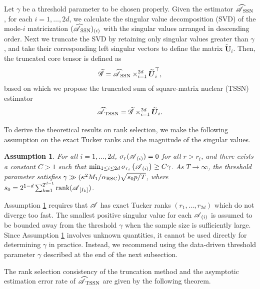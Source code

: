 \documentclass[12pt]{article}
\newtheorem{assumption}{Assumption}
\newcommand{\bm}{\boldsymbol}
\newcommand{\cm}[1]{\mbox{\boldmath$\mathscr{#1}$}}
\begin{document}

Let $\gamma$ be a threshold parameter to be chosen properly. Given the estimator  $\cm{\widehat{A}}_{\text{SSN}}$, for each $i=1, \dots, 2d$, we calculate the singular value decomposition (SVD) of the mode-$i$ matricization $(\cm{\widehat{A}}_{\text{SSN}})_{(i)}$ with the singular values arranged in descending order. Next we truncate the SVD by retaining only singular values greater than $\gamma$, and  take their corresponding left singular vectors to define the matrix $\bm{\widetilde{U}}_i$. Then, the truncated core tensor is defined as \[\cm{\widetilde{G}}=\cm{\widehat{A}}_{\text{SSN}}\times_{i=1}^{2d}\bm{\widetilde{U}}_i^\top,\]
based on which we propose the truncated sum of square-matrix nuclear (TSSN) estimator
\[
\cm{\widehat{A}}_{\text{TSSN}}=\cm{\widetilde{G}}\times_{i=1}^{2d}\bm{\widetilde{U}}_i.
\]

To derive the theoretical results on rank selection, we make the following assumption on the exact Tucker ranks and the magnitude of the singular values.

\begin{assumption}\label{asmp:truncate}
For all $i=1,\dots,2d$, $\sigma_r(\cm{A}_{(i)})=0$ for all $r>r_i$, and there exists a constant $C>1$ such that $\min_{1\leq i\leq 2d}\sigma_{r_i}\left(\cm{A}_{(i)}\right)\geq C\gamma$. As $T\rightarrow\infty$, the threshold parameter satisfies $\gamma \gg (\kappa^2M_1/\alpha_{\textup{RSC}}) \sqrt{s_0p/T}$, where $s_0=2^{1-d}\sum_{k=1}^{2^{d-1}}\textup{rank}(\cm{A}_{[I_k]})$.
\end{assumption}


Assumption \ref{asmp:truncate} requires that $\cm{A}$ has exact Tucker ranks $(r_1,\dots,r_{2d})$ which do not diverge too fast. The smallest positive singular value for each $\cm{A}_{(i)}$ is assumed to be bounded away from the threshold $\gamma$ when the sample size is sufficiently large. Since Assumption  \ref{asmp:truncate} involves unknown quantities, it cannot be used directly for determining $\gamma$ in practice.  Instead, we recommend using the data-driven threshold parameter $\gamma$ described at the end of the next subsection.

The rank selection consistency of the truncation method and the asymptotic estimation error rate of $\cm{\widehat{A}}_{\text{TSSN}}$ are given by the following theorem. 
\end{document}
